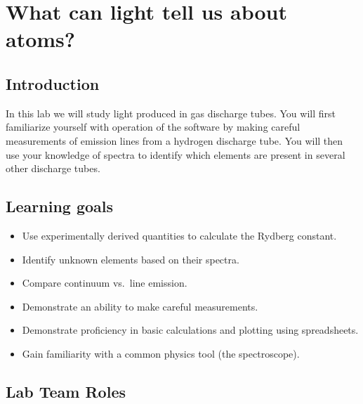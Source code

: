 \chapter{What can light tell us about atoms?}

%

\section{Introduction}

In this lab we will study light produced in gas discharge tubes.
You will first familiarize yourself with operation of the software by making careful measurements of emission lines from a hydrogen discharge tube.
You will then use your knowledge of spectra to identify which elements are present in several other discharge tubes.

\section{Learning goals}

\begin{itemize}
	\item Use experimentally derived quantities to calculate the Rydberg constant.
	\item Identify unknown elements based on their spectra.
	\item Compare continuum vs.\ line emission.
	\item Demonstrate an ability to make careful measurements.
	\item Demonstrate proficiency in basic calculations and plotting using spreadsheets.
	\item Gain familiarity with a common physics tool (the spectroscope).
\end{itemize}

\section{Lab Team Roles}

